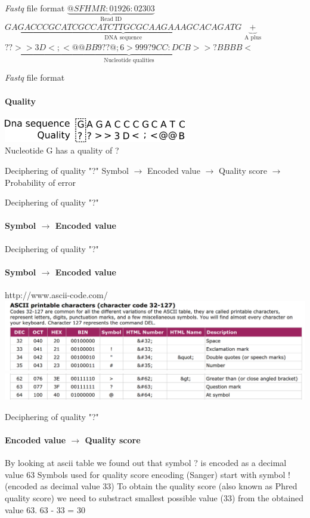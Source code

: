 \documentclass{beamer}
\begin{document}
\newcommand{\fastq}{\textit{fastq}}
\begin{frame}{\textit{Fastq} file format}
	$\underbrace{@SFHMR:01926:02303}_\text{Read ID}$
	\pause 
	$\underbrace{GAGACCCGCATCGCCATCTTGCGCAAGAAAGCACAGATG}_\text{DNA sequence}$
	\pause
	$\underbrace{+}_\text{A plus}$
	\pause
	$\underbrace{??>>3D<;<@@BB9??@;6>999?9CC:DCB>>?BBBB<}_\text{Nucleotide qualities}$
\end{frame}
\begin{frame}{\textit{Fastq} file format}
\framesubtitle{Quality}
\includegraphics[width=8cm, keepaspectratio]{pic/fq_qual.png} \\
Nucleotide G has a quality of ?
\end{frame}

\begin{frame}{Deciphering of quality "?"}
Symbol $\rightarrow$ Encoded value $\rightarrow$ Quality score $\rightarrow$ Probability of error
\end{frame}

\begin{frame}{Deciphering of quality "?"}
\framesubtitle{Symbol $\rightarrow$ Encoded value}
\end{frame}

\begin{frame}{Deciphering of quality "?"}
\framesubtitle{Symbol $\rightarrow$ Encoded value}
http://www.ascii-code.com/ \\
\includegraphics[width=\linewidth, keepaspectratio]{pic/ascii_head3.png} \\
\includegraphics[width=\linewidth, keepaspectratio]{pic/ascii_tail3.png} \\
\end{frame}

\begin{frame}{Deciphering of quality "?"}
\framesubtitle{Encoded value $\rightarrow$ Quality score}
By looking at ascii table we found out that symbol ? is encoded as a decimal value 63
Symbols used for quality score encoding (Sanger) start with symbol ! (encoded as decimal value 33)
To obtain the quality score (also known as Phred quality score) we need to substract smallest possible value (33) from the obtained value 63.
63 - 33 = 30
\end{frame}
\end{document}
